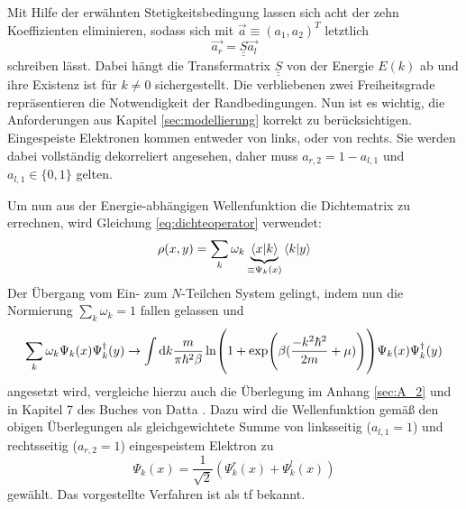 Mit Hilfe der erwähnten Stetigkeitsbedingung lassen sich acht der zehn Koeffizienten eliminieren, sodass sich mit $\vec{a}\equiv(a_1, a_2)^T$ letztlich
\begin{equation*}
  \vec{a_r} = \underline{\underline{S}} \vec{a_l}
\end{equation*}
schreiben lässt. Dabei hängt die Transfermatrix $\underline{\underline{S}}$ von der Energie $E(k)$ ab und ihre Existenz ist für $k\neq 0$ sichergestellt.
 Die verbliebenen zwei Freiheitsgrade repräsentieren die Notwendigkeit der Randbedingungen. Nun ist es wichtig, die Anforderungen aus Kapitel \ref{sec:modellierung} korrekt zu berücksichtigen. Eingespeiste Elektronen kommen entweder von links, oder von rechts. Sie werden dabei vollständig dekorreliert angesehen, daher muss ${a_{r,2}=1-a_{l,1}}$ und ${a_{l,1}\in\{0,1\}}$ gelten.

Um nun aus der Energie-abhängigen Wellenfunktion die Dichtematrix zu errechnen, wird Gleichung \eqref{eq:dichteoperator} verwendet:
\begin{equation*}
  \rho(x,y) = \sum_k \omega_k \underbrace{\bra{x}\ket{k}}_{\equiv\Psi_k(x)}\bra{k}\ket{y}
\end{equation*}
Der Übergang vom Ein- zum $N$-Teilchen System gelingt, indem nun die Normierung $\sum_k \omega_k = 1$ fallen gelassen und
\begin{equation*}
  \sum_k \omega_k  \Psi_k(x) \Psi_k^{\dagger}(y) \rightarrow \int \mathop{}\!\mathrm{d} k \frac{m}{\pi\hbar^2\beta} \ln(1+\exp(\beta(\frac{- k^2\hbar^2}{2m} + \mu))) \Psi_k(x) \Psi_k^{\dagger}(y)
\end{equation*}
angesetzt wird, vergleiche hierzu auch die Überlegung im Anhang \ref{sec:A_2} und in Kapitel 7 des Buches von Datta \cite{datta}. Dazu wird die Wellenfunktion gemäß den obigen Überlegungen als gleichgewichtete Summe von linksseitig (${a_{l,1}=1}$) und rechtsseitig (${a_{r,2}=1}$) eingespeistem Elektron zu
\begin{equation*}
  \Psi_k(x) = \frac{1}{\sqrt{2}}(\Psi_k^r(x) + \Psi_k^l(x))
\end{equation*}
gewählt. Das vorgestellte Verfahren ist als \ac{tf} bekannt.




